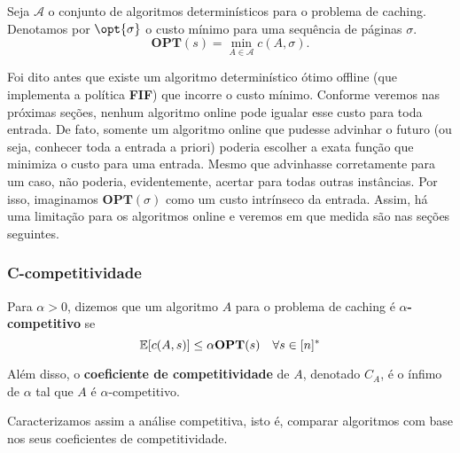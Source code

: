 \begin{definition}
  Seja \(\mathcal{A}\) o conjunto de algoritmos determinísticos para o problema de caching. Denotamos por \(\opt{\sigma}\) o custo mínimo para uma sequência de páginas \(\sigma\).
  \begin{equation}
    \textbf{OPT}(s) = \min_{A \in \mathcal{A}} c(A,\sigma).
  \end{equation}
\end{definition}

Foi dito antes que existe um algoritmo determinístico ótimo offline (que implementa a política \textbf{FIF}) que incorre o custo mínimo. Conforme veremos nas próximas seções, nenhum algoritmo online pode igualar esse custo para toda entrada. De fato, somente um algoritmo online que pudesse advinhar o futuro (ou seja, conhecer toda a entrada a priori) poderia escolher a exata função que minimiza o custo para uma entrada. Mesmo que advinhasse corretamente para um caso, não poderia, evidentemente, acertar para todas outras instâncias. Por isso, imaginamos \(\textbf{OPT}(\sigma)\) como um custo intrínseco da entrada. Assim, há uma limitação para os algoritmos online e veremos em que medida são nas seções seguintes.

\subsubsection{C-competitividade}

\begin{definition}
  Para \(\alpha > 0\), dizemos que um algoritmo \(A\) para o problema de caching é \(\alpha\)\textbf{-competitivo} se
\begin{equation}
  \mathbb{E}[c(A,s)] \le \alpha \bold{OPT}(s) \quad \forall s \in [n]^*
\end{equation}

Além disso, o \textbf{coeficiente de competitividade} de \(A\), denotado \(C_A\), é o ínfimo de \(\alpha\) tal que \(A\) é \(\alpha\)-competitivo.

\end{definition}

 Caracterizamos assim a análise competitiva, isto é, comparar algoritmos com base nos seus coeficientes de competitividade. 

